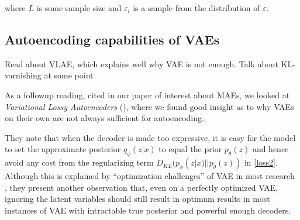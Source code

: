 \documentclass{article} %
\begin{document}
where $L$ is some sample size and $\varepsilon_l$ is a sample from the
distribution of $\varepsilon$.

%
%
%
%
%

\subsection {Autoencoding capabilities of VAEs}
Read about VLAE, which explains well why VAE is not enough. Talk about
KL-varnishing at some point

As a followup reading, cited in our paper of interest about MAEs, we looked at
\textit{Variational Lossy Autoencoders} (\citet{vlae}), where we found good
insight as to why VAEs on their own are not always sufficient for autoencoding.

They note that when the decoder is made too expressive, it is easy for the model
to set the approximate posterior $q_{\phi}(z|x)$ to equal the prior
$p_{\theta}(z)$ and hence avoid any cost from the regularizing term
$D_{KL}(p_\phi(z|x)||p_\theta(z))$ in \ref{loss2}. Although this is explained by
``optimization challenges'' of VAE in most research
, they present another observation that, even on a perfectly optimized VAE,
ignoring the latent variables should still result in optimum results in most
instances of VAE with intractable true posterior and powerful enough decoders.

\end{document}
